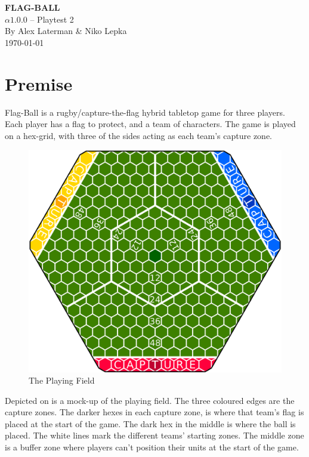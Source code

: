 \documentclass[a4paper]{book}
\begin{document}
\begin{titlepage}
\begin{center}
    \huge{\textbf{FLAG-BALL}}\\
    \LARGE{
        $\alpha1.0.0$ -- Playtest 2\\
        By Alex Laterman \& Niko Lepka
    }\\
    \Large{\today}
\end{center}
\end{titlepage}
\thispagestyle{empty} %
\frontmatter %

\section*{Premise}
Flag-Ball is a rugby/capture-the-flag hybrid tabletop game for three players.
Each player has a flag to protect, and a team of characters.
The game is played on a hex-grid, with three of the sides acting as each team's capture zone.
\begin{figure}
    \centering
    \includegraphics[width=\textwidth]{graphics/board-2}
    \caption{The Playing Field}
    \label{fig:court}
\end{figure}
Depicted on  is a mock-up of the playing field.
The three coloured edges are the capture zones.
The darker hexes in each capture zone, is where that team's flag is placed at the start of the game.
The dark hex in the middle is where the ball is placed.
The white lines mark the different teams' starting zones.
The middle zone is a buffer zone where players can’t position their units at the start of the game.
\end{document}
